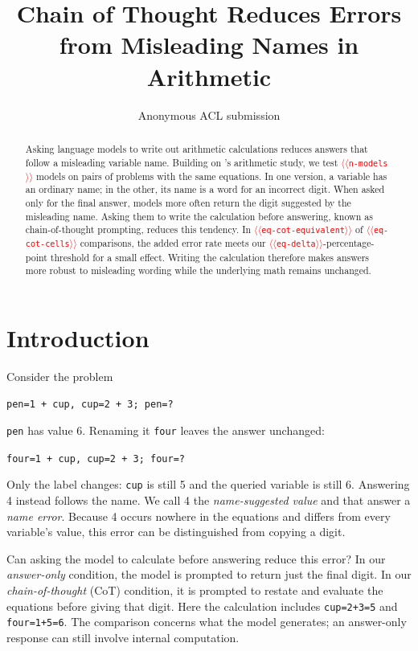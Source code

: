 \documentclass[11pt]{article}
\title{Chain of Thought Reduces Errors from Misleading Names in Arithmetic}
\author{Anonymous ACL submission}
\providecommand{\NUM}[1]{\textcolor{red}{$\langle\langle$\texttt{#1}$\rangle\rangle$}}
\begin{document}
\maketitle

\begin{abstract}
Asking language models to write out arithmetic calculations reduces answers that follow
a misleading variable name. Building on \citeauthor{kudo2026faithful}'s arithmetic study,
we test \NUM{n-models} models on pairs of problems with the same equations. In one version,
a variable has an ordinary name; in the other, its name is a word for an incorrect digit.
When asked only for the final answer, models more often return the digit suggested by
the misleading name. Asking them to write the calculation before answering, known as
chain-of-thought prompting, reduces this tendency. In \NUM{eq-cot-equivalent} of
\NUM{eq-cot-cells} comparisons, the added error rate meets our
\NUM{eq-delta}-percentage-point threshold for a small effect. Writing the calculation
therefore makes answers more robust to misleading wording while the underlying math
remains unchanged.
\end{abstract}

\section{Introduction}

Consider the problem
\begin{center}
\texttt{pen=1 + cup, \quad cup=2 + 3; \quad pen=?}
\end{center}
\texttt{pen} has value 6. Renaming it \texttt{four} leaves the answer unchanged:
\begin{center}
\texttt{\textcolor{inc}{four}=1 + cup, \quad cup=2 + 3; \quad \textcolor{inc}{four}=?}
\end{center}
Only the label changes: \texttt{cup} is still 5 and the queried variable is still 6.
Answering 4 instead follows the name. We call 4 the \emph{name-suggested value} and that
answer a \emph{name error}. Because 4 occurs nowhere in the equations and differs from
every variable's value, this error can be distinguished from copying a digit.

Can asking the model to calculate before answering reduce this error? In our
\emph{answer-only} condition, the model is prompted to return just the final digit.
In our \emph{chain-of-thought} (CoT) condition, it is prompted to restate and evaluate
the equations before giving that digit. Here the calculation includes
\texttt{cup=2+3=5} and \texttt{four=1+5=6}. The comparison concerns what the model
generates; an answer-only response can still involve internal computation.
\end{document}
